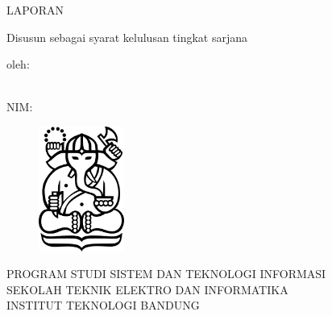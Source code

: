 \clearpage
\pagestyle{empty}

\begin{center}
    \smallskip

    \Large \MakeUppercase{\bfseries \thetitle}
    \vfill

    \normalsize \MakeUppercase{Laporan \jenislaporan}
    \vfill

    \normalsize Disusun sebagai syarat kelulusan tingkat sarjana
    \vfill

    \normalsize oleh:

    \normalsize \theauthor \\
    \normalsize NIM: \nim

    \vfill
    \begin{figure}[h]
        \centering
        \includegraphics[width=0.25\textwidth]{resources/cover-ganesha.jpg}
    \end{figure}
    \vfill

    \large
    \uppercase{
        Program Studi Sistem dan Teknologi Informasi \\
        Sekolah Teknik Elektro dan Informatika \\
        Institut Teknologi Bandung
    }

    \yearsidang

\end{center}

\clearpage
